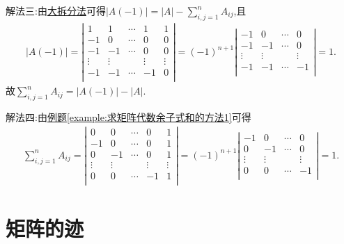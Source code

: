 \documentclass[lang=cn,newtx,10pt,scheme=chinese]{elegantbook}
\begin{document}
\begin{solution}
{\color{blue}解法三:}由\hyperref[大拆分法]{大拆分法}可得$\left| A\left( -1 \right) \right|=\left| A \right|-\sum_{i,j=1}^n{A_{ij}}$,且
\begin{align*}
\left| A\left( -1 \right) \right|=\left| \begin{matrix}
1&		1&		\cdots&		1&		1\\
-1&		0&		\cdots&		0&		0\\
-1&		-1&		\cdots&		0&		0\\
\vdots&		\vdots&		&		\vdots&		\vdots\\
-1&		-1&		\cdots&		-1&		0\\
\end{matrix} \right|=\left( -1 \right) ^{n+1}\left| \begin{matrix}
-1&		0&		\cdots&		0\\
-1&		-1&		\cdots&		0\\
\vdots&		\vdots&		&		\vdots\\
-1&		-1&		\cdots&		-1\\
\end{matrix} \right|=1.
\end{align*}
故$\sum_{i,j=1}^n{A_{ij}}=\left| A\left( -1 \right) \right|-\left| A \right|$.

{\color{blue}解法四:}由\hyperref[example:求矩阵代数余子式和的方法1]{例题\ref{example:求矩阵代数余子式和的方法1}}可得
\begin{align*}
\sum_{i,j=1}^n{A_{ij}}=\left| \begin{matrix}
0&		0&		\cdots&		0&		1\\
-1&		0&		\cdots&		0&		1\\
0&		-1&		\cdots&		0&		1\\
\vdots&		\vdots&		&		\vdots&		\vdots\\
0&		0&		\cdots&		-1&		1\\
\end{matrix} \right|=(-1)^{n+1}\left| \begin{matrix}
-1&		0&		\cdots&		0\\
0&		-1&		\cdots&		0\\
\vdots&		\vdots&		&		\vdots\\
0&		0&		\cdots&		-1\\
\end{matrix} \right|=1.
\end{align*}
\end{solution}

\section{矩阵的迹}
\end{document}
